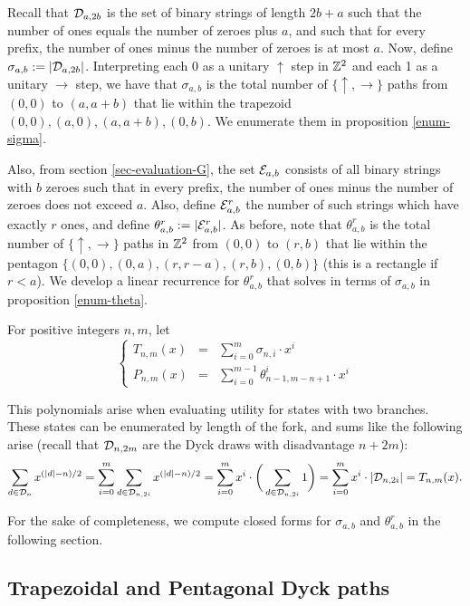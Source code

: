 Recall that $\mathcal{D}_{a,2b}$ is the set of binary strings of length $2b+a$ such that the number of ones equals the number of zeroes plus $a$, and such that for every prefix, the number of ones minus the number of zeroes is at most $a$. Now, define $\sigma_{a,b}:=|\mathcal{D}_{a,2b}|$. Interpreting each 0 as a unitary $\uparrow$ step in $\mathbb{Z}^2$ and each 1 as a unitary $\rightarrow$ step, we have that $\sigma_{a,b}$ is the total number of $\{\uparrow,\rightarrow\}$ paths from $(0,0)$ to $(a,a+b)$ that lie within the trapezoid ${(0,0),(a,0),(a,a+b),(0,b)}$. We enumerate them in proposition \ref{enum-sigma}.

Also, from section \ref{sec-evaluation-G}, the set $\mathcal{E}_{a,b}$ consists of all binary strings with $b$ zeroes such that in every prefix, the number of ones minus the number of zeroes does not exceed $a$. Also, define $\mathcal{E}_{a,b}^r$ the number of such strings which have exactly $r$ ones, and define $\theta_{a,b}^r:= |\mathcal{E}_{a,b}^r|$. As before, note that $\theta_{a,b}^r$ is the total number of $\{\uparrow,\rightarrow\}$ paths in $\mathbb{Z}^2$ from $(0,0)$ to $(r,b)$ that lie within the pentagon $\{(0,0),(0,a),(r,r-a), (r,b), (0,b)\}$ (this is a rectangle if $r<a$). We develop a linear recurrence for $\theta_{a,b}^r$ that solves in terms of $\sigma_{a,b}$ in proposition \ref{enum-theta}. 

\begin{mydef}
For positive integers $n,m$, let
$$
\left\{
\begin{array}{lll}
T_{n,m}(x) &=& \displaystyle \sum_{i = 0}^{m} \sigma_{n,i}\cdot x^i\\
P_{n,m}(x) &=& \displaystyle \sum_{i = 0}^{m-1} \theta_{n-1,m-n+1}^i\cdot x^i
\end{array}
\right.
$$
\end{mydef}

This polynomials arise when evaluating utility for states with two branches. These states can be enumerated by length of the fork, and sums like the following arise (recall that $\mathcal{D}_{n,2m}$ are the Dyck draws with disadvantage $n+2m$):
$$
\sum_{d\in \mathcal{D}_{n}} x^{(|d|-n)/2} = \sum_{i=0}^m \sum_{d\in \mathcal{D}_{n,2i}} x^{(|d|-n)/2} = \sum_{i=0}^m x^i\cdot  \bigg(\sum_{d\in\mathcal{D}_{n,2i}} 1\bigg) = \sum_{i=0}^m x^i\cdot |\mathcal{D}_{n,2i}| = T_{n,m}(x).
$$

For the sake of completeness, we compute closed forms for $\sigma_{a,b}$ and $\theta_{a,b}^r$ in the following section.



 \subsection{Trapezoidal and Pentagonal Dyck paths}
 \label{appendix-trapezoid}
 
